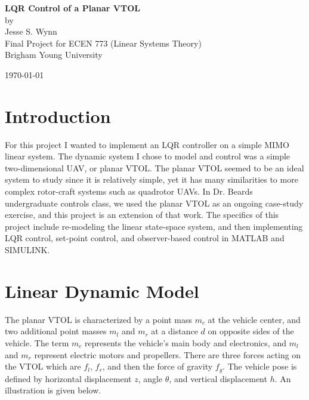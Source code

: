 \documentclass[dvips,12pt]{article}
\begin{document}
\begin{titlepage}

\begin{center}

\vspace*{\fill}

\vspace{0.5in}

{ \LARGE \bfseries LQR Control of a Planar VTOL}\\[.25in]

\large
by\\[.25 in]
Jesse S. Wynn\\[1in]

Final Project for ECEN 773 (Linear Systems Theory) \\
Brigham Young University \\

\vspace{1in}

\today

\vspace*{\fill}

\end{center}

\end{titlepage}

\section{Introduction}
For this project I wanted to implement an LQR controller on a simple MIMO linear system.  The dynamic system I chose to model and control was a simple two-dimensional UAV, or planar VTOL.  The planar VTOL seemed to be an ideal system to study since it is relatively simple, yet it has many similarities to more complex rotor-craft systems such as quadrotor UAVs.  In Dr. Beards undergraduate controls class, we used the planar VTOL as an ongoing case-study exercise, and this project is an extension of that work.  The specifics of this project include re-modeling the linear state-space system, and then implementing LQR control, set-point control, and observer-based control in MATLAB and SIMULINK.  

\section{Linear Dynamic Model}

The planar VTOL is characterized by a point mass $m_c$ at the vehicle center, and two additional point masses $m_l$ and $m_r$ at a distance $d$ on opposite sides of the vehicle.  The term $m_c$ represents the vehicle's main body and electronics, and $m_l$ and $m_r$ represent electric motors and propellers.  There are three forces acting on the VTOL which are $f_l$, $f_r$, and then the force of gravity $f_g$.  The vehicle pose is defined by horizontal displacement $z$, angle $\theta$, and vertical displacement $h$. An illustration is given below.
\end{document}
